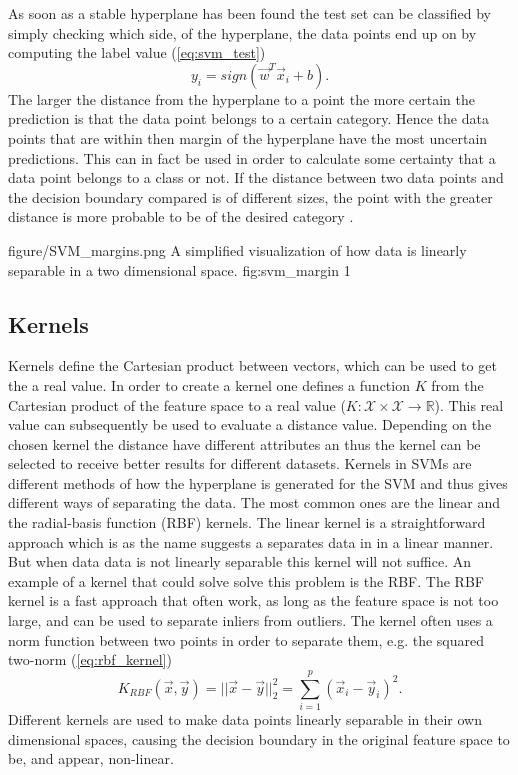 As soon as a stable hyperplane has been found the test set can be classified by simply checking which side, of the hyperplane, the data points end up on by computing the label value (\ref{eq:svm_test})
\begin{equation}
\label{eq:svm_test}
y_i = sign\left(\vec{w}^T\vec{x}_i+b\right).
\end{equation}
The larger the distance from the hyperplane to a point the more certain the prediction is that the data point belongs to a certain category. Hence the data points that are within then margin of the hyperplane have the most uncertain predictions. This can in fact be used in order to calculate some certainty that a data point belongs to a class or not. If the distance between two data points and the decision boundary compared is of different sizes, the point with the greater distance is more probable to be of the desired category \cite{tong2001support}. 


\singlefigure
{figure/SVM_margins.png}
{A simplified visualization of how data is linearly separable in a two dimensional space.}
{fig:svm_margin}
{1}


\subsection{Kernels}

Kernels define the Cartesian product between vectors, which can be used to get the a real value. In order to create a kernel one defines a function $K$ from the Cartesian product of the feature space to a real value ($K:\mathcal{X}\times \mathcal{X} \rightarrow \mathbb{R}$). This real value can subsequently be used to evaluate a distance value. Depending on the chosen kernel the distance have different attributes an thus the kernel can be selected to receive better results for different datasets.
Kernels in SVMs are different methods of how the hyperplane is generated for the SVM and thus gives different ways of separating the data.  The most common ones are the linear and the radial-basis function (RBF) kernels. The linear kernel is a straightforward approach which is as the name suggests a separates data in in a linear manner. 
But when data data is not linearly separable this kernel will not suffice. 
An example of a kernel that could solve solve this problem is the RBF. The RBF kernel is a fast approach that often work, as long as the feature space is not too large, and can be used to separate inliers from outliers. The kernel often uses a norm function between two points in order to separate them, e.g. the squared two-norm  (\ref{eq:rbf_kernel})
\begin{equation}
\label{eq:rbf_kernel}
K_{RBF}(\vec{x},\vec{y}) = ||\vec{x}-\vec{y}||_2 ^2=\sum_{i=1}^p  (\vec{x}_i-\vec{y}_i)^2.
\end{equation}
Different kernels are used to make data points linearly separable in their own dimensional spaces, causing the decision boundary in the original feature space to be, and appear, non-linear.
